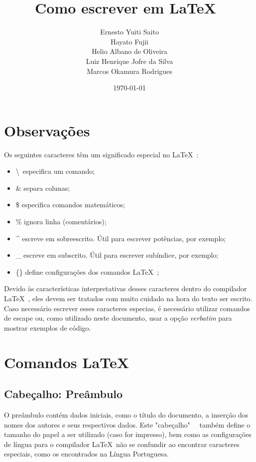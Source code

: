 \documentclass[a4paper,12pt]{article}
\title{Como escrever em \LaTeX\ }
\author{
	Ernesto Yuiti Saito\\
	Hayato Fujii\\
	Helio Albano de Oliveira\\
	Luiz Henrique Jofre da Silva\\
	Marcos Okamura Rodrigues\\
}
\date{\today}
\begin{document}
\maketitle


\section{Observações}
\hspace{2cm}Os seguintes caracteres têm um significado especial no \LaTeX\ :
\begin{itemize}
\item \textbackslash \ especifica um comando;
\item \& separa colunas;
\item \$ especifica comandos matemáticos;
\item \% ignora linha (comentários);
\item \^{} escreve em sobreescrito. Útil para escrever potências, por exemplo;
\item \_  escreve em subscrito. Útil para escrever subíndice, por exemplo;
\item \{\} define configurações dos comandos \LaTeX\ ;
\end{itemize}
\hspace{2cm}Devido às características interpretativas desses caracteres dentro do compilador \LaTeX\ , eles devem ser tratados com muito cuidado na hora do texto ser escrito. Caso necessário escrever esses caracteres especias, é necessário utilizar comandos de escape ou, como utilizado neste documento, usar a opção \textit{verbatim} para mostrar exemplos de código.

\section{Comandos \LaTeX\ }
\subsection{Cabeçalho: Preâmbulo}
\hspace{2cm}O preâmbulo contém dados iniciais, como o título do documento, a inserção dos nomes dos autores e seus respectivos dados. Este "cabeçalho"  \ \ também define o tamanho do papel a ser utilizado (caso for impresso), bem como as configurações de língua para o compilador \LaTeX\ não se confundir ao encontrar caracteres especiais, como os encontrados na Língua Portuguesa.
\end{document}
